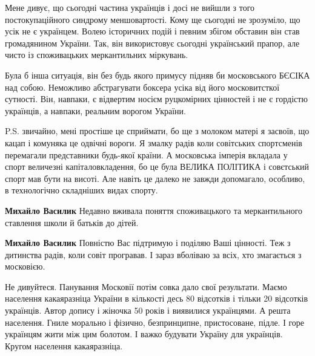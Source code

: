 \begin{itemize}

Мене дивує, що сьогодні частина українців і досі не вийшли з того
постокупаційного синдрому меншовартості. Кому ще сьогодні не зрозуміло, що усік
не є українцем. Волею історичних подій і певним збігом обставин він став
громадянином України. Так, він використовує сьогодні український прапор, але
чисто із споживацьких меркантильних міркувань. 

Була б інша ситуація, він без будь якого примусу підняв би московського БЄСІКА
над собою. Неможливо абстрагувати боксера усіка від його московитсткої
сутності. Він, навпаки, є відвертим носієм руцкомірних цінностей і не є
гордістю українців, а навпаки, реальним ворогом України.

P.S. звичайно, мені простіше це сприймати, бо ще з молоком матері я засвоїв, що
кацап і комуняка це одвічні вороги. Я змалку радів коли совітських спортсменів
перемагали представники будь-якої країни. А московська імперія вкладала у спорт
величезні капіталовкладення, бо це була ВЕЛИКА ПОЛІТИКА і совєтський спорт мав
бути на висоті. Але навіть це далеко не завжди допомагало, особливо, в
технологічно складніших видах спорту.

\begin{itemize} %
\textbf{Михайло Василик} Недавно вживала поняття споживацького та меркантильного ставлення школи й батьків до дітей.

\textbf{Михайло Василик} Повністю Вас підтримую і поділяю Ваші цінності. Теж з дитинства радів, коли совіт програвав. І зараз вболіваю за всіх, хто змагається з московією.
\end{itemize} %


Не дивуйтеся. Панування Московії потім совка дало свої результати. Маємо
населення какаяразніца України в кількості десь 80 відсотків і тільки 20
відсотків українців. Автор допису і жіночка 50 років і виявилися українцями. А
решта населення. Гниле морально і фізично, безпринципне, пристосоване, підле. І
горе українцям жити між цим болотом. І важко будувати Україну для українців.
Кругом населення какаяразніца.


\end{itemize} %
